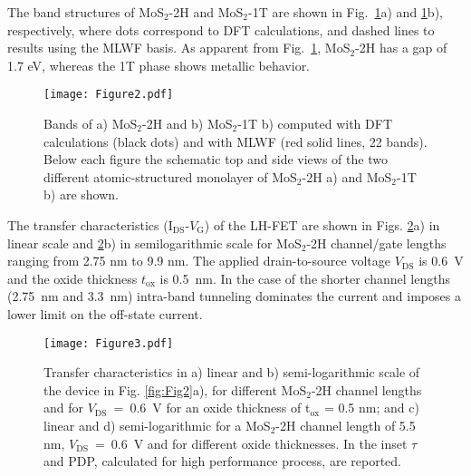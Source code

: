 \documentclass[aps,reprint,superscriptaddress,secnumarabic,amssymb,showpacs]{revtex4-1}
\begin{document}
The band structures of MoS$_2$-2H and MoS$_2$-1T are shown in Fig.~\ref{fig:Fig1}a) and \ref{fig:Fig1}b), respectively, where dots correspond to DFT calculations, and dashed lines to results using the MLWF basis. As apparent  from Fig.~\ref{fig:Fig1}, MoS$_2$-2H has a gap of 1.7 eV, whereas the 1T phase shows metallic behavior. 

\begin{figure} [h!!!]
\texttt{[image: Figure2.pdf]}
\caption{Bands of a) MoS$_2$-2H and b) MoS$_2$-1T b) computed with DFT calculations (black dots) and with MLWF (red solid lines, 22 bands). Below each figure the schematic top and side views of the two different atomic-structured monolayer of MoS$_2$-2H a) and MoS$_2$-1T b) are shown.}
\label{fig:Fig1}
\end{figure}

The transfer characteristics (I$_{\text{DS}}$-$V_{\text{G}}$) of the LH-FET are shown in Figs. \ref{fig:Fig3}a) in linear scale and \ref{fig:Fig3}b) in semilogarithmic scale for MoS$_2$-2H channel/gate lengths ranging from 2.75 nm to 9.9 nm. The applied drain-to-source voltage  $V_{\text{DS}}$ is 0.6~V and the oxide thickness $t_{\text{ox}}$ is 0.5~nm. In the case of the shorter channel lengths (2.75~nm and 3.3~nm) intra-band tunneling dominates the current and imposes a lower limit on the off-state current.

\begin{figure} [h!!!]
\texttt{[image: Figure3.pdf]}
\caption{Transfer characteristics in a) linear and b) semi-logarithmic scale of the device in Fig. \ref{fig:Fig2}a), for different MoS$_2$-2H channel lengths and for $V_{\text{DS}}$~=~0.6~V for an oxide thickness of $\text{t}_{\text{ox}}$ = 0.5 nm; and c) linear and d) semi-logarithmic for a MoS$_2$-2H channel length of 5.5 nm, $V_{\text{DS}}$~=~0.6~V and for different oxide thicknesses. In the inset $\tau$ and PDP, calculated for high performance process, are reported.}
\label{fig:Fig3}
\end{figure}
\end{document}
